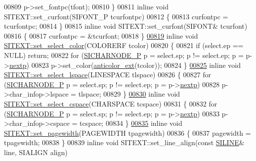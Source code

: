 \begin{DoxyCode}
00809         p->set\_fontpc(tfont);
00810 \}
00811 \textcolor{keyword}{inline} \textcolor{keywordtype}{void} SITEXT::set\_curfont(SIFONT\_P tcurfontpc)
00812 \{
00813     curfontpc = tcurfontpc;
00814 \}
00815 \textcolor{keyword}{inline} \textcolor{keywordtype}{void} SITEXT::set\_curfont(SIFONT& tcurfont)
00816 \{
00817     curfontpc = &tcurfont;
00818 \}
\hyperlink{class_s_i_t_e_x_t_abfd80c912a40b72c0cb113ad147b3d33}{00819} \textcolor{keyword}{inline} \textcolor{keywordtype}{void} \hyperlink{class_s_i_t_e_x_t_abfd80c912a40b72c0cb113ad147b3d33}{SITEXT::set\_select\_color}(COLORERF tcolor)
00820 \{
00821     \textcolor{keywordflow}{if} (select.ep == NULL) \textcolor{keywordflow}{return};
00822     \textcolor{keywordflow}{for} (\hyperlink{class_s_i_c_h_a_r_n_o_d_e}{SICHARNODE\_P} p = select.sp; p != select.ep; p = p->\hyperlink{class_s_i_c_h_a_r_n_o_d_e_ab188ae5c7731bcc66a1042defcf158c8}{nextp})
00823         p->set\_color(\hyperlink{kernal_8h_abd07a7735390aea7bf376c2bcc75bd96}{anticolor\_ext}(tcolor));
00824 \}
\hyperlink{class_s_i_t_e_x_t_af79cfc54434033545610de0dc0580fa9}{00825} \textcolor{keyword}{inline} \textcolor{keywordtype}{void} \hyperlink{class_s_i_t_e_x_t_af79cfc54434033545610de0dc0580fa9}{SITEXT::set\_select\_lspace}(LINESPACE tlspace)
00826 \{
00827     \textcolor{keywordflow}{for} (\hyperlink{class_s_i_c_h_a_r_n_o_d_e}{SICHARNODE\_P} p = select.sp; p != select.ep; p = p->\hyperlink{class_s_i_c_h_a_r_n_o_d_e_ab188ae5c7731bcc66a1042defcf158c8}{nextp})
00828         p->char\_infop->lspace = tlspace;
00829 \}
\hyperlink{class_s_i_t_e_x_t_a4fde9667222b3289a6c98da2871661af}{00830} \textcolor{keyword}{inline} \textcolor{keywordtype}{void} \hyperlink{class_s_i_t_e_x_t_a4fde9667222b3289a6c98da2871661af}{SITEXT::set\_select\_cspace}(CHARSPACE tcspace)
00831 \{
00832     \textcolor{keywordflow}{for} (\hyperlink{class_s_i_c_h_a_r_n_o_d_e}{SICHARNODE\_P} p = select.sp; p != select.ep; p = p->\hyperlink{class_s_i_c_h_a_r_n_o_d_e_ab188ae5c7731bcc66a1042defcf158c8}{nextp})
00833         p->char\_infop->cspace = tcspace;
00834 \}
\hyperlink{class_s_i_t_e_x_t_a324e28153c8ebfeb4cabc3b82171c5e5}{00835} \textcolor{keyword}{inline} \textcolor{keywordtype}{void} \hyperlink{class_s_i_t_e_x_t_a324e28153c8ebfeb4cabc3b82171c5e5}{SITEXT::set\_pagewidth}(PAGEWIDTH tpagewidth)
00836 \{
00837     pagewidth = tpagewidth;
00838 \}
00839 \textcolor{keyword}{inline} \textcolor{keywordtype}{void} SITEXT::set\_line\_align(\textcolor{keyword}{const} \hyperlink{struct_s_i_r_a_n_g_e}{SILINE}& line, SIALIGN align)

\end{DoxyCode}
